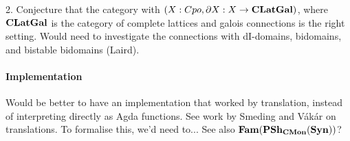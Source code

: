 2. Conjecture that the category with $(X : Cpo, \partial X : X \to \mathbf{CLatGal})$, where $\mathbf{CLatGal}$ is the category of complete lattices and galois connections is the right setting. Would need to investigate the connections with dI-domains, bidomains, and bistable bidomains (Laird).

\paragraph{Implementation}

Would be better to have an implementation that worked by translation,
instead of interpreting directly as Agda functions. See work by
Smeding and Vákár on translations. To formalise this, we'd need
to... See also $\mathbf{Fam}(\mathbf{PSh}_{\mathbf{CMon}}(\mathbf{Syn}))$?
